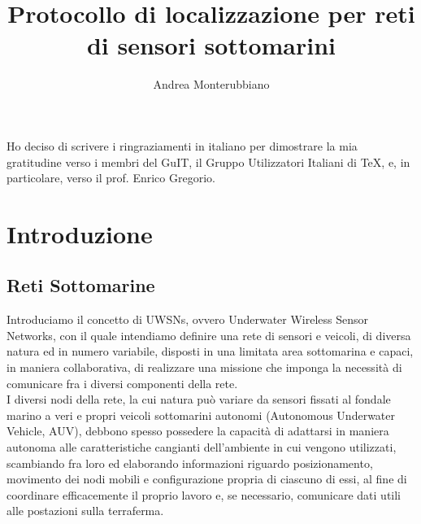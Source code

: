\documentclass[Lau,binding=0.6cm]{sapthesis}
\title{Protocollo di localizzazione per reti di sensori sottomarini}
\author{Andrea Monterubbiano}
\begin{document}
\frontmatter

\maketitle

\dedication{Dedicato a\\ Donald Knuth}

\begin{abstract}

\end{abstract}

\begin{acknowledgments}
Ho deciso di scrivere i ringraziamenti in italiano
per dimostrare la mia gratitudine verso i membri
del GuIT, il Gruppo Utilizzatori Italiani di \TeX, e, in particolare,
verso il prof. Enrico Gregorio.
\end{acknowledgments}

\tableofcontents

\mainmatter

\chapter{Introduzione}

\section{Reti Sottomarine}
Introduciamo il concetto di UWSNs, ovvero Underwater Wireless  Sensor Networks, con il quale intendiamo definire una rete di sensori e veicoli, di diversa natura ed in numero variabile, disposti in una limitata area sottomarina e capaci, in maniera collaborativa, di realizzare una missione che imponga la necessità di comunicare fra i diversi componenti della rete.\\
I diversi nodi della rete, la cui natura può variare da sensori fissati al fondale marino a veri e propri veicoli sottomarini autonomi (Autonomous Underwater Vehicle, AUV), debbono spesso possedere la capacità di adattarsi in maniera autonoma alle caratteristiche cangianti dell'ambiente in cui vengono utilizzati, scambiando fra loro ed elaborando informazioni riguardo posizionamento, movimento dei nodi mobili e configurazione propria di ciascuno di essi, al fine di coordinare efficacemente il proprio lavoro e, se necessario, comunicare dati utili alle postazioni sulla terraferma.
\end{document}
